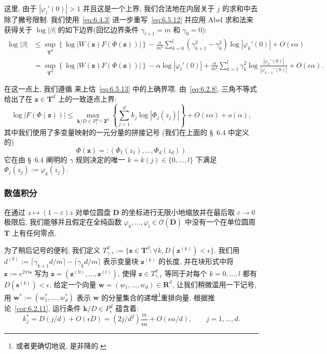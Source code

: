 这里, 由于 $|\varphi_l'(0)| > 1$ 并且这是一个上界, 我们合法地在内层关于 $j$ 的求和中去除了撇号限制.
我们使用~\eqref{eq:6.4.3} 进一步重写~\eqref{eq:6.5.12} 并应用 Abel 求和法来获得关于 $\log |\beta|$ 的如下边界(回忆边界条件 $\gamma_{l+1} = m$ 和 $\gamma_0 = 0$):
\begin{align}
\log |\beta| &\le \sup_{\mathbf{T}^d} \left\{ \log |W(\mathbf{z})F(\Phi(\mathbf{z}))| \right\} - \frac{\alpha}{m^2} \sum_{k=0}^l (\gamma_{k+1}^2 - \gamma_k^2) \log |\varphi_k'(0)| + O(\epsilon \alpha) \nonumber\\
&= \sup_{\mathbf{T}^d} \left\{ \log |W(\mathbf{z})F(\Phi(\mathbf{z}))| \right\} - \alpha \log |\varphi_l'(0)| + \frac{\alpha}{m^2} \sum_{k=1}^l \gamma_k^2 \log \frac{|\varphi_k'(0)|}{|\varphi_{k-1}'(0)|} + O(\epsilon \alpha).\label{eq:6.5.13}
\end{align}

在这一点上, 我们遵循 \cite[§ 2.5.14]{CDT21} 来上估~\eqref{eq:6.5.13} 中的上确界项.
由~\eqref{eq:6.2.8}, 三角不等式给出了在 $\mathbf{z} \in \mathbf{T}^d$ 上的一致逐点上界:
\begin{equation}\label{eq:6.5.14}
\log |F(\Phi(\mathbf{z}))| \le \max_{\mathbf{k}/D \in P_{\epsilon}^d \cap \mathbf{Z}^d} \left\{ \sum_{j=1}^d k_j \log |\Phi_j(z_j)| \right\} + O(\epsilon \alpha) + o(\alpha),
\end{equation}
其中我们使用了多变量映射的一元分量的拼接记号 (我们在上面的 \S~6.4 中定义的)
\[ \Phi(\mathbf{z}) =: (\Phi_1(z_1), \dots, \Phi_d(z_d)) \]
它在由 \S~6.4 阐明的 $\gamma$ 规则决定的唯一 $k = k(j) \in \{0, \dots, l\}$ 下满足 $\Phi_j(z_j) := \varphi_k(z_j)$.

\subsubsection{数值积分}\label{sec:6.5.15}

在通过 $z \mapsto (1-\varepsilon)z$ 对单位圆盘 $\mathbf{D}$ 的坐标进行无限小地缩放并在最后取 $\varepsilon \to 0$ 极限后, 我们能够并且假定在全纯函数 $\varphi_0, \ldots, \varphi_l \in \mathcal{O}(\overline{\mathbf{D}})$ 中没有一个在单位圆周 $\mathbf{T}$ 上有任何零点.

为了稍后记号的便利, 我们定义 $T_{\gamma,\epsilon}^d := \{\mathbf{z} \in \mathbf{T}^d : \forall k, D(\mathbf{z}^{(k)}) < \epsilon\}$.
我们用 $d^{(k)} := \lceil \gamma_{k+1} d/m \rceil - \lceil \gamma_k d/m \rceil$ 表示变量块 $\mathbf{z}^{(k)}$ 的长度, 并在块形式中将 $\mathbf{z} := e^{2\pi i \mathbf{s}}$ 写为 $\mathbf{z} = (\mathbf{z}^{(0)}, \dots, \mathbf{z}^{(l)})$, 使得 $\mathbf{z} \in T_{\gamma,\epsilon}^d$ 等同于对每个 $k = 0, \dots, l$ 都有 $D(\mathbf{s}^{(k)}) < \epsilon$.
给定一个向量 $\mathbf{w} = (w_1, \dots, w_d) \in \mathbf{R}^d$, 让我们稍微滥用一下记号, 用 $\mathbf{w}^* := (w_1^*, \dots, w_d^*)$ 表示 $\mathbf{w}$ 的分量集合的递增\footnote{或者更确切地说, 是非降的.}重排向量.
根据推论~\ref{cor:6.2.11}, 运行条件 $\mathbf{k}/D \in P_{\epsilon}^d$ 蕴含着:
\begin{equation}\label{eq:6.5.16}
k_j^* = D(j/d) + O(\epsilon D) = (2j/d^2) \frac{\alpha}{m} + O(\epsilon \alpha/d), \qquad j = 1, \dots, d.
\end{equation}

